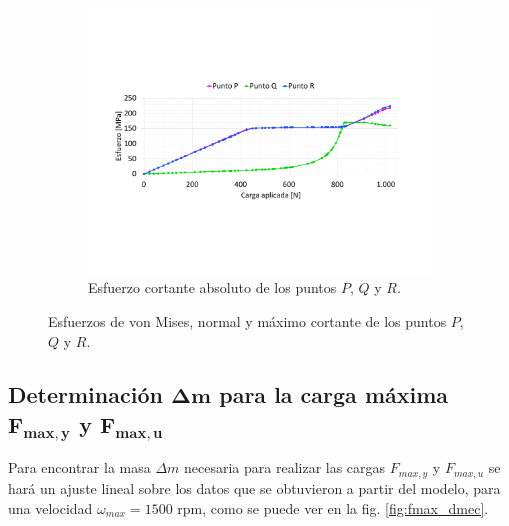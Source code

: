 \begin{figure}[p]
	\begin{subfigure}{1\linewidth}
		\centering
		\includegraphics[width=\linewidth, trim={2cm 5cm 2cm 5cm},clip]{Imagenes/esfpqr_ms.pdf}
		\caption{Esfuerzo cortante absoluto de los puntos $P$, $Q$ y $R$.}
		\label{fig:esfpqr_ms}
	\end{subfigure}
\caption{Esfuerzos de von Mises, normal y máximo cortante de los puntos $P$, $Q$ y $R$.}
\label{fig:esf_pqr}
\end{figure}

\newpage

\subsection{Determinación $\mathbf{\Delta m}$ para la carga máxima $\mathbf{F_{max,y}}$ y $\mathbf{F_{max,u}}$}

Para encontrar la masa $\Delta m$ necesaria para realizar las cargas $F_{max,y}$ y $F_{max,u}$ se hará un ajuste lineal sobre los datos que se obtuvieron a partir del modelo, para una velocidad $\omega_{max}= 1500$ rpm, como se puede ver en la fig. \ref{fig:fmax_dmec}.


